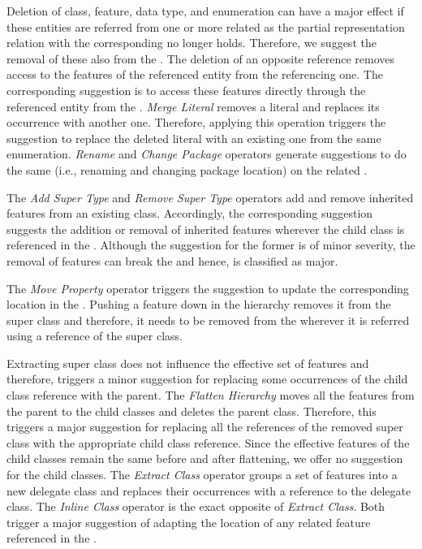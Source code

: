 Deletion of class, feature, data type, and enumeration can have a major effect if these entities are referred from one or more related \viewtypes as the partial representation relation with the corresponding \metamodel no longer holds. Therefore, we suggest the removal of these also from the \viewtypes. The deletion of an opposite reference removes access to the features of the referenced entity from the referencing one. The corresponding suggestion is to access these features directly through the referenced entity from the \viewtype. \textit{Merge Literal} removes a literal and replaces its occurrence with another one. Therefore, applying this operation triggers the suggestion to replace the deleted literal with an existing one from the same enumeration. \textit{Rename} and \textit{Change Package} operators generate suggestions to do the same (i.e., renaming and changing package location) on the related \viewtypes.

The \textit{Add Super Type} and \textit{Remove Super Type} operators add and remove inherited features from an existing class. Accordingly, the corresponding suggestion suggests the addition or removal of inherited features wherever the child class is referenced in the \viewtype. Although the suggestion for the former is of minor severity, the removal of features can break the \viewtype and hence, is classified as major.

The \textit{Move Property} operator triggers the suggestion to update the corresponding location in the \viewtype. Pushing a feature down in the hierarchy removes it from the super class and therefore, it needs to be removed from the \viewtype wherever it is referred using a reference of the super class.

Extracting super class does not influence the effective set of features and therefore, triggers a minor suggestion for replacing some occurrences of the child class reference with the parent. The \textit{Flatten Hierarchy} moves all the features from the parent to the child classes and deletes the parent class. Therefore, this triggers a major suggestion for replacing all the references of the removed super class with the appropriate child class reference. Since the effective features of the child classes remain the same before and after flattening, we offer no suggestion for the child classes. The \textit{Extract Class} operator groups a set of features into a new delegate class and replaces their occurrences with a reference to the delegate class. The \textit{Inline Class} operator is the exact opposite of \textit{Extract Class}. Both trigger a major suggestion of adapting the location of any related feature referenced in the \viewtype.

